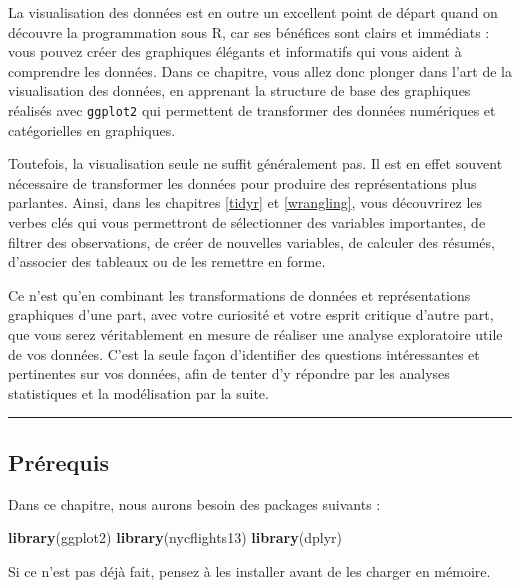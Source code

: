 \documentclass[
  a4paper,
]{article}
\newenvironment{Shaded}{\begin{snugshade}}{\end{snugshade}}
\newcommand{\KeywordTok}[1]{\textcolor[rgb]{0.12,0.11,0.11}{\textbf{#1}}}
\newcommand{\NormalTok}[1]{\textcolor[rgb]{0.12,0.11,0.11}{#1}}
\begin{document}
La visualisation des données est en outre un excellent point de départ quand on découvre la programmation sous R, car ses bénéfices sont clairs et immédiats : vous pouvez créer des graphiques élégants et informatifs qui vous aident à comprendre les données. Dans ce chapitre, vous allez donc plonger dans l'art de la visualisation des données, en apprenant la structure de base des graphiques réalisés avec \texttt{ggplot2} qui permettent de transformer des données numériques et catégorielles en graphiques.

Toutefois, la visualisation seule ne suffit généralement pas. Il est en effet souvent nécessaire de transformer les données pour produire des représentations plus parlantes. Ainsi, dans les chapitres \ref{tidyr} et \ref{wrangling}, vous découvrirez les verbes clés qui vous permettront de sélectionner des variables importantes, de filtrer des observations, de créer de nouvelles variables, de calculer des résumés, d'associer des tableaux ou de les remettre en forme.

Ce n'est qu'en combinant les transformations de données et représentations graphiques d'une part, avec votre curiosité et votre esprit critique d'autre part, que vous serez véritablement en mesure de réaliser une analyse exploratoire utile de vos données. C'est la seule façon d'identifier des questions intéressantes et pertinentes sur vos données, afin de tenter d'y répondre par les analyses statistiques et la modélisation par la suite.

\begin{center}\rule{0.5\linewidth}{0.5pt}\end{center}

\hypertarget{pruxe9requis}{%
\subsection{Prérequis}\label{pruxe9requis}}

Dans ce chapitre, nous aurons besoin des packages suivants :

\begin{Shaded}
\begin{Highlighting}[]
\KeywordTok{library}\NormalTok{(ggplot2)}
\KeywordTok{library}\NormalTok{(nycflights13)}
\KeywordTok{library}\NormalTok{(dplyr)}
\end{Highlighting}
\end{Shaded}

Si ce n'est pas déjà fait, pensez à les installer avant de les charger en mémoire.
\end{document}
